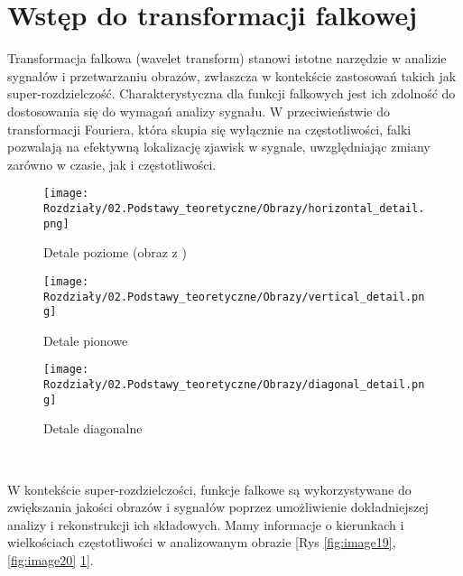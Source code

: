 \section{Wstęp do transformacji falkowej}


Transformacja falkowa (wavelet transform) stanowi istotne narzędzie w analizie sygnałów i przetwarzaniu obrazów, zwłaszcza w kontekście zastosowań takich jak super-rozdzielczość. Charakterystyczna dla funkcji falkowych jest ich zdolność do dostosowania się do wymagań analizy sygnału. W przeciwieństwie do transformacji Fouriera, która skupia się wyłącznie na częstotliwości, falki pozwalają na efektywną lokalizację zjawisk w sygnale, uwzględniając zmiany zarówno w czasie, jak i częstotliwości.

\begin{figure}[ht]
    \centering

    \begin{minipage}[t]{0.3\linewidth}
        \texttt{[image: Rozdziały/02.Podstawy\_teoretyczne/Obrazy/horizontal\_detail.png]}
        \caption{Detale poziome (obraz z \cite{zeyde2010single})}
        \label{fig:image19}
    \end{minipage}
    \hspace{0.5cm}
    \begin{minipage}[t]{0.3\linewidth}
        \texttt{[image: Rozdziały/02.Podstawy\_teoretyczne/Obrazy/vertical\_detail.png]}
        \caption{Detale pionowe}
        \label{fig:image20}
    \end{minipage}
    \hspace{0.5cm}
    \begin{minipage}[t]{0.3\linewidth}
        \texttt{[image: Rozdziały/02.Podstawy\_teoretyczne/Obrazy/diagonal\_detail.png]}
        \caption{Detale diagonalne}
        \label{fig:image21}
    \end{minipage}
\end{figure}\

W kontekście super-rozdzielczości, funkcje falkowe są wykorzystywane do zwiększania jakości obrazów i sygnałów poprzez umożliwienie dokładniejszej analizy i rekonstrukcji ich składowych. Mamy informacje o kierunkach i wielkościach częstotliwości w analizowanym obrazie [Rys \ref{fig:image19}, \ref{fig:image20} \ref{fig:image21}]. 


